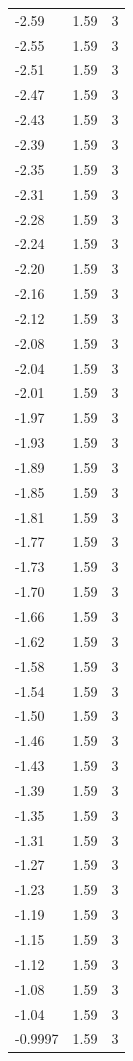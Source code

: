 \begin{longtable}{lrr}
  -2.59 & 1.59 & 3 \\
  -2.55 & 1.59 & 3 \\
  -2.51 & 1.59 & 3 \\
  -2.47 & 1.59 & 3 \\
  -2.43 & 1.59 & 3 \\
  -2.39 & 1.59 & 3 \\
  -2.35 & 1.59 & 3 \\
  -2.31 & 1.59 & 3 \\
  -2.28 & 1.59 & 3 \\
  -2.24 & 1.59 & 3 \\
  -2.20 & 1.59 & 3 \\
  -2.16 & 1.59 & 3 \\
  -2.12 & 1.59 & 3 \\
  -2.08 & 1.59 & 3 \\
  -2.04 & 1.59 & 3 \\
  -2.01 & 1.59 & 3 \\
  -1.97 & 1.59 & 3 \\
  -1.93 & 1.59 & 3 \\
  -1.89 & 1.59 & 3 \\
  -1.85 & 1.59 & 3 \\
  -1.81 & 1.59 & 3 \\
  -1.77 & 1.59 & 3 \\
  -1.73 & 1.59 & 3 \\
  -1.70 & 1.59 & 3 \\
  -1.66 & 1.59 & 3 \\
  -1.62 & 1.59 & 3 \\
  -1.58 & 1.59 & 3 \\
  -1.54 & 1.59 & 3 \\
  -1.50 & 1.59 & 3 \\
  -1.46 & 1.59 & 3 \\
  -1.43 & 1.59 & 3 \\
  -1.39 & 1.59 & 3 \\
  -1.35 & 1.59 & 3 \\
  -1.31 & 1.59 & 3 \\
  -1.27 & 1.59 & 3 \\
  -1.23 & 1.59 & 3 \\
  -1.19 & 1.59 & 3 \\
  -1.15 & 1.59 & 3 \\
  -1.12 & 1.59 & 3 \\
  -1.08 & 1.59 & 3 \\
  -1.04 & 1.59 & 3 \\
  -0.9997 & 1.59 & 3 \\

\end{longtable}
